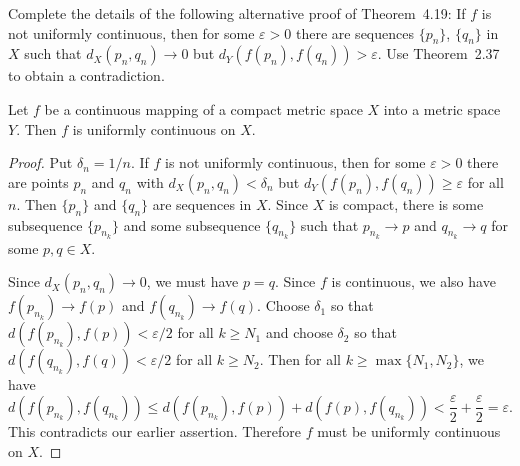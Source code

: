  Complete the details of the following alternative proof
of Theorem~4.19: If $f$ is not uniformly continuous, then for some
$\varepsilon > 0$ there are sequences $\{p_n\}$, $\{q_n\}$ in $X$ such
that $d_X(p_n,q_n) \to 0$ but $d_Y(f(p_n), f(q_n)) > \varepsilon$. Use
Theorem~2.37 to obtain a contradiction.
\begin{thm}[4.19]
  Let $f$ be a continuous mapping of a compact metric space $X$ into a
  metric space $Y$. Then $f$ is uniformly continuous on $X$.
\end{thm}
\begin{proof}
  Put $\delta_n = 1/n$. If $f$ is not uniformly continuous, then for
  some $\varepsilon > 0$ there are points $p_n$ and $q_n$ with
  $d_X(p_n,q_n) < \delta_n$ but $d_Y(f(p_n),f(q_n))\geq\varepsilon$
  for all $n$. Then $\{p_n\}$ and $\{q_n\}$ are sequences in
  $X$. Since $X$ is compact, there is some subsequence $\{p_{n_k}\}$
  and some subsequence $\{q_{n_k}\}$ such that $p_{n_k}\to p$ and
  $q_{n_k}\to q$ for some $p,q\in X$.

  Since $d_X(p_n,q_n)\to 0$, we must have $p = q$. Since $f$ is
  continuous, we also have $f(p_{n_k}) \to f(p)$ and
  $f(q_{n_k}) \to f(q)$. Choose $\delta_1$ so that
  $d(f(p_{n_k}),f(p)) < \varepsilon/2$ for all $k \geq N_1$ and choose
  $\delta_2$ so that $d(f(q_{n_k}),f(q)) < \varepsilon/2$ for all
  $k \geq N_2$. Then for all $k\geq\max\{N_1,N_2\}$, we have
  \begin{equation*}
    d(f(p_{n_k}), f(q_{n_k}))
    \leq d(f(p_{n_k}), f(p)) + d(f(p), f(q_{n_k}))
    < \frac\varepsilon2 + \frac\varepsilon2 = \varepsilon.
  \end{equation*}
  This contradicts our earlier assertion. Therefore $f$ must be
  uniformly continuous on $X$.
\end{proof}

